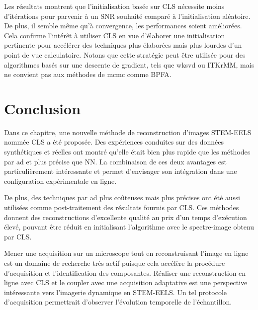 Les résultats montrent que l'initialisation basée sur CLS nécessite moins d'itérations pour parvenir à un SNR souhaité comparé à l'initialisation aléatoire. De plus, il semble même qu'à convergence, les performances soient améliorées.
%
Cela confirme l'intérêt à utiliser CLS en vue d'élaborer une initialisation pertinente pour accélérer des techniques plus élaborées mais plus lourdes d'un point de vue calculatoire.  Notons que cette stratégie peut être utilisée pour des algorithmes basés sur une descente de gradient, tels que \gls{wksvd} ou ITKrMM, mais ne convient pas aux méthodes de \gls{mcmc} comme BPFA.


%
\section{Conclusion}

Dans ce chapitre, une nouvelle méthode de reconstruction d'images STEM-EELS nommée CLS a été proposée. Des expériences conduites sur des données synthétiques et réelles ont montré qu'elle était bien plus rapide que les méthodes par \gls{ad} et plus précise que NN. La combinaison de ces deux avantages est particulièrement intéressante et permet d'envisager son intégration dans une configuration expérimentale en ligne.

De plus, des techniques par \gls{ad} plus coûteuses mais plus précises ont été aussi utilisées comme post-traitement des résultats fournis par CLS. 
%
Ces méthodes donnent des reconstructions d'excellente qualité au prix d'un temps d'exécution élevé, pouvant être réduit en initialisant l'algorithme avec le spectre-image obtenu par CLS.

Mener une acquisition sur un microscope tout en reconstruisant l'image en ligne est un domaine de recherche très actif puisque cela accélère la procédure d'acquisition et l'identification des composantes. Réaliser une reconstruction en ligne avec CLS et le coupler avec une acquisition adaptative est une perspective intéressante vers l'imagerie dynamique en STEM-EELS. Un tel protocole d'acquisition permettrait d'observer l'évolution temporelle de l'échantillon.




